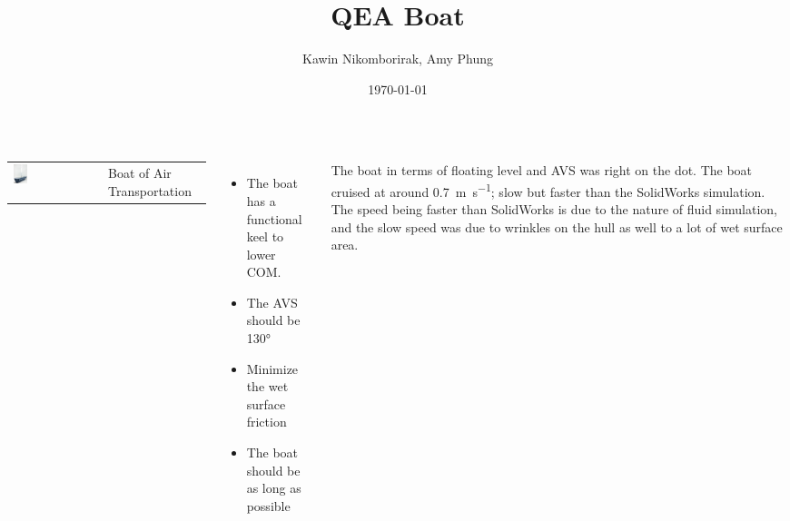 \documentclass[20pt, a2paper, landscape]{tikzposter}
\title{QEA Boat}
\author{Kawin Nikomborirak, Amy Phung}
\date{\today}
\begin{document}
\maketitle

\begin{columns}

  {
    \begin{tabularx}{0.4\textwidth}{l X}
    \includegraphics[width=0.17\textwidth]{FinishedBoat.jpg} &
    Boat of Air Transportation
    \end{tabularx}
  }

  {
    \begin{itemize}
    \item The boat has a functional keel to lower COM.
    \item The AVS should be \ang{130}
    \item Minimize the wet surface friction
    \item The boat should be as long as possible
    \end{itemize}
  }



  {
    The boat in terms of floating level and AVS was right on the dot.
    The boat cruised at around \SI{.7}{\meter\per\second}; slow but faster than the SolidWorks simulation.
    The speed being faster than SolidWorks is due to the nature of fluid simulation, and the slow speed was due to wrinkles on the hull as well to a lot of wet surface area.
  }


\end{columns}
\end{document}
